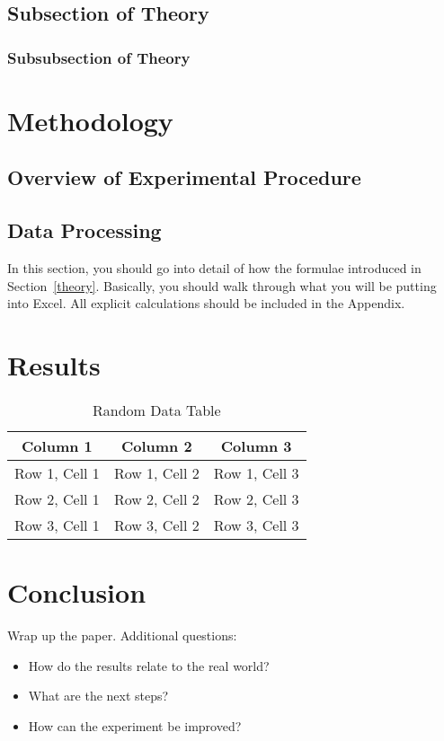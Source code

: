 \documentclass{juniorlabs}
\begin{document}
    \subsection{Subsection of Theory}

    \subsubsection{Subsubsection of Theory}


    \section{Methodology} \label{methodology}
    \subsection{Overview of Experimental Procedure}

    \subsection{Data Processing}
    In this section, you should go into detail of how the formulae introduced in Section~\ref{theory}.
    Basically, you should walk through what you will be putting into Excel.
    All explicit calculations should be included in the Appendix.


    \section{Results}
    \begin{table}[ht]
        \centering
        \caption{Random Data Table}
        \begin{tabular}{ccc}
            \toprule
            \textbf{Column 1} & \textbf{Column 2} & \textbf{Column 3} \\
            \midrule
            Row 1, Cell 1     & Row 1, Cell 2     & Row 1, Cell 3     \\
            Row 2, Cell 1     & Row 2, Cell 2     & Row 2, Cell 3     \\
            Row 3, Cell 1     & Row 3, Cell 2     & Row 3, Cell 3     \\
            \bottomrule
        \end{tabular}
    \end{table}


    \section{Conclusion}
    Wrap up the paper.
    Additional questions:
    \begin{itemize}
        \item How do the results relate to the real world?
        \item What are the next steps?
        \item How can the experiment be improved?
    \end{itemize}
\end{document}
